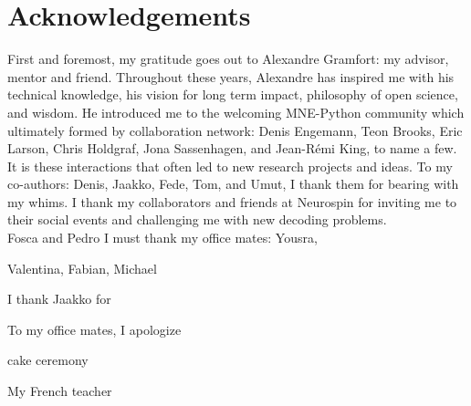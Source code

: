 \chapter*{Acknowledgements}

First and foremost, my gratitude goes out to Alexandre Gramfort: my advisor, mentor and friend. Throughout these years, Alexandre has inspired me with his technical knowledge, his vision for long term impact, philosophy of open science, and wisdom. He introduced me to the welcoming MNE-Python community which ultimately formed by collaboration network: Denis Engemann, Teon Brooks, Eric Larson, Chris Holdgraf, Jona Sassenhagen, and Jean-Rémi King, to name a few. It is these interactions that often led to new research projects and ideas. To my co-authors: Denis, Jaakko, Fede, Tom, and Umut, I thank them for bearing with my whims. I thank my collaborators and friends at Neurospin for inviting me to their social events and challenging me with new decoding problems. \\
Fosca and Pedro
I must thank my office mates: Yousra, 

Valentina, Fabian, Michael

I thank Jaakko for 

To my office mates, I apologize


cake ceremony

My French teacher
